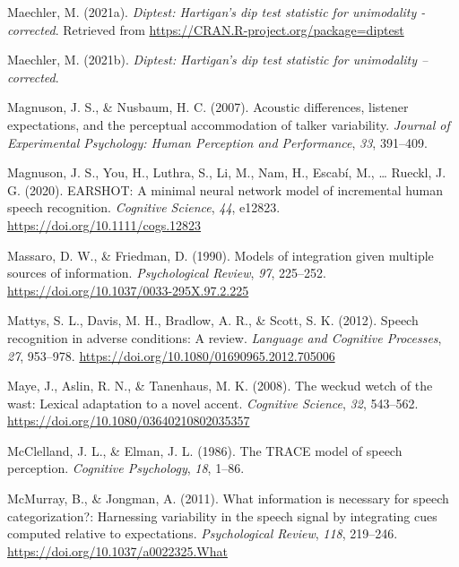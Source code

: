 \documentclass[
  11pt,
  english,
  man,floatsintext]{apa6}
\newlength{\cslhangindent}
\newlength{\cslentryspacingunit} %
\newenvironment{CSLReferences}[2] %
 {%
  \setlength{\parindent}{0pt}
  \ifodd #1
  \let\oldpar\par
  \def\par{\hangindent=\cslhangindent\oldpar}
  \fi
  \setlength{\parskip}{#2\cslentryspacingunit}
 }%
 {}
\begin{document}
\begin{CSLReferences}{1}{0}
\leavevmode{}%
Maechler, M. (2021a). \emph{Diptest: Hartigan's dip test statistic for unimodality - corrected}. Retrieved from \url{https://CRAN.R-project.org/package=diptest}

\leavevmode{}%
Maechler, M. (2021b). \emph{Diptest: Hartigan's dip test statistic for unimodality -- corrected}.

\leavevmode{}%
Magnuson, J. S., \& Nusbaum, H. C. (2007). Acoustic differences, listener expectations, and the perceptual accommodation of talker variability. \emph{Journal of Experimental Psychology: Human Perception and Performance}, \emph{33}, 391--409.

\leavevmode{}%
Magnuson, J. S., You, H., Luthra, S., Li, M., Nam, H., Escabí, M., \ldots{} Rueckl, J. G. (2020). EARSHOT: A minimal neural network model of incremental human speech recognition. \emph{Cognitive Science}, \emph{44}, e12823. \url{https://doi.org/10.1111/cogs.12823}

\leavevmode{}%
Massaro, D. W., \& Friedman, D. (1990). Models of integration given multiple sources of information. \emph{Psychological Review}, \emph{97}, 225--252. \url{https://doi.org/10.1037/0033-295X.97.2.225}

\leavevmode{}%
Mattys, S. L., Davis, M. H., Bradlow, A. R., \& Scott, S. K. (2012). Speech recognition in adverse conditions: A review. \emph{Language and Cognitive Processes}, \emph{27}, 953--978. \url{https://doi.org/10.1080/01690965.2012.705006}

\leavevmode{}%
Maye, J., Aslin, R. N., \& Tanenhaus, M. K. (2008). The weckud wetch of the wast: Lexical adaptation to a novel accent. \emph{Cognitive Science}, \emph{32}, 543--562. \url{https://doi.org/10.1080/03640210802035357}

\leavevmode{}%
McClelland, J. L., \& Elman, J. L. (1986). The TRACE model of speech perception. \emph{Cognitive Psychology}, \emph{18}, 1--86.

\leavevmode{}%
McMurray, B., \& Jongman, A. (2011). What information is necessary for speech categorization?: Harnessing variability in the speech signal by integrating cues computed relative to expectations. \emph{Psychological Review}, \emph{118}, 219--246. \url{https://doi.org/10.1037/a0022325.What}


\end{CSLReferences}
\end{document}
